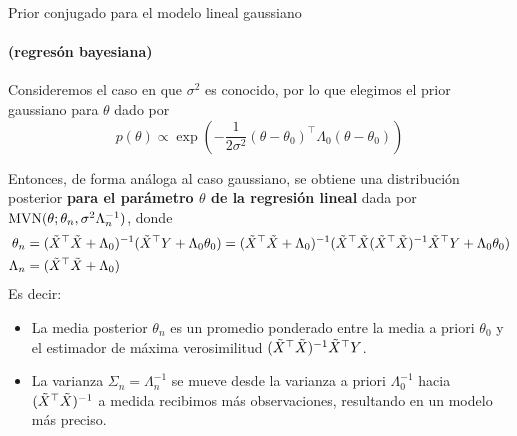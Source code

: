 \documentclass[9pt, handout]{beamer}
\begin{document}
\begin{frame}{Prior conjugado para el modelo lineal gaussiano}
\framesubtitle{(regresón bayesiana)}


Consideremos el caso en que $\sigma^2$ es conocido, por lo que elegimos el prior gaussiano para $\theta$ dado por
\begin{equation*}
	p(\theta) \propto \exp\left(-\frac{1}{2\sigma^2}(\theta-\theta_0)^\top\Lambda_0(\theta-\theta_0)\right)
\end{equation*}\pause

Entonces, de forma análoga al caso gaussiano, se obtiene una distribución posterior \textbf{para el parámetro $\theta$ de la regresión lineal} dada por $\operatorname{\text{MVN}}(\theta; \theta_n,\sigma^2\Lambda_n^{-1})$, donde  
\begin{align*}
	\theta_n &= (\tilde{X}^\top \tilde{X} + \Lambda_0)^{-1} (\tilde{X}^\top  Y + \Lambda_0\theta_0) = (\tilde{X}^\top \tilde{X} + \Lambda_0)^{-1} (\tilde{X}^\top \tilde{X} (\tilde{X}^\top \tilde{X})^{-1}\tilde{X}^\top  Y + \Lambda_0\theta_0)\label{eq:mean_post_lin_g}\\
	\Lambda_n &= (\tilde{X}^\top \tilde{X} + \Lambda_0)
\end{align*}\pause
Es decir:

\begin{itemize}
	\item La media posterior $\theta_n$ es un promedio ponderado entre la media a priori $\theta_0$ y el estimador de máxima verosimilitud $(\tilde{X}^\top \tilde{X})^{-1}\tilde{X}^\top  Y$.
	\item La varianza $\Sigma_n = \Lambda_n^{-1}$ se mueve desde la varianza a priori $\Lambda_0^{-1}$ hacia $(\tilde{X}^\top \tilde{X})^{-1}$ a medida recibimos más observaciones, resultando en un modelo más preciso.
\end{itemize}
	
\end{frame}
\end{document}
